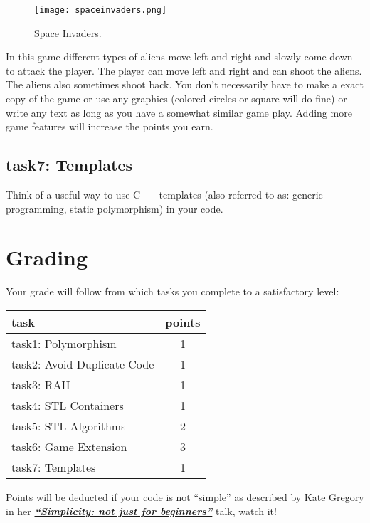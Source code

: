 \documentclass[12pt]{article}
\newcommand*{\link}[2]{\href{#1}{\color{blue}\textbf{\textit{#2}}}}
\begin{document}
\begin{figure}
\centerline{\texttt{[image: spaceinvaders.png]}}
\caption{Space Invaders.}
\label{space_invaders_fig}
\end{figure}

In this game different types of aliens move left and right and slowly
come down to attack the player. The player can move left and right and
can shoot the aliens. The aliens also sometimes shoot back. You don't
necessarily have to make a exact copy of the game or use any graphics
(colored circles or square will do fine) or write any text as long as
you have a somewhat similar game play. Adding more game features will
increase the points you earn.

\subsection{task7: Templates}
Think of a useful way to use C++ templates (also referred
to as: generic programming, static polymorphism) in your code.

\section{Grading}
Your grade will follow from which tasks you complete to a satisfactory
level:
\begin{center}
\begin{tabular}{ |l|c| } 
  \hline
  \textbf{task}               &  \textbf{points}\\ \hline
  task1: Polymorphism         &               1 \\
  task2: Avoid Duplicate Code &               1 \\
  task3: RAII                 &               1 \\
  task4: STL Containers       &               1 \\
  task5: STL Algorithms       &               2 \\
  task6: Game Extension       &               3 \\
  task7: Templates            &               1 \\
  \hline
\end{tabular}
\end{center}

Points will be deducted if your code is not ``simple'' as described by
Kate Gregory in her \link{https://www.youtube.com/watch?v=n0Ak6xtVXno}
{``Simplicity: not just for beginners''} talk, watch it!
\end{document}
